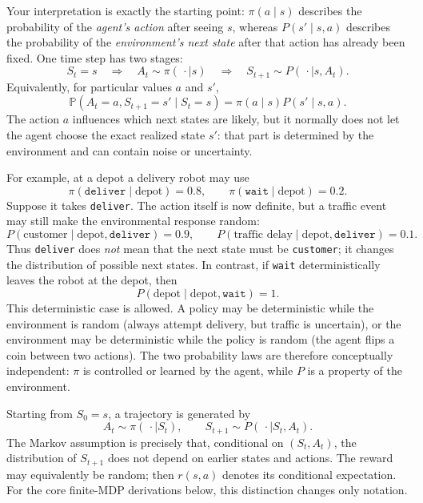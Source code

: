 \documentclass[11pt,a4paper]{article}
\theoremstyle{definition}
\begin{document}
\begin{note}
Your interpretation is exactly the starting point: $\pi(a\mid s)$ describes the probability
of the \emph{agent's action} after seeing $s$, whereas $P(s'\mid s,a)$ describes the
probability of the \emph{environment's next state} after that action has already been fixed.
One time step has two stages:
\[
S_t=s
\quad\Longrightarrow\quad
A_t\sim\pi(\,\cdot\mid s)
\quad\Longrightarrow\quad
S_{t+1}\sim P(\,\cdot\mid s,A_t).
\]
Equivalently, for particular values $a$ and $s'$,
\[
\mathbb{P}(A_t=a,S_{t+1}=s'\mid S_t=s)
=\pi(a\mid s)P(s'\mid s,a).
\]
The action $a$ influences which next states are likely, but it normally does not let the
agent choose the exact realized state $s'$: that part is determined by the environment and
can contain noise or uncertainty.

For example, at a depot a delivery robot may use
\[
\pi(\texttt{deliver}\mid\text{depot})=0.8,
\qquad
\pi(\texttt{wait}\mid\text{depot})=0.2.
\]
Suppose it takes \texttt{deliver}. The action itself is now definite, but a traffic event may
still make the environmental response random:
\[
P(\text{customer}\mid\text{depot},\texttt{deliver})=0.9,
\qquad
P(\text{traffic delay}\mid\text{depot},\texttt{deliver})=0.1.
\]
Thus \texttt{deliver} does \emph{not} mean that the next state must be
\texttt{customer}; it changes the distribution of possible next states. In contrast, if
\texttt{wait} deterministically leaves the robot at the depot, then
\[
P(\text{depot}\mid\text{depot},\texttt{wait})=1.
\]
This deterministic case is allowed. A policy may be deterministic while the environment is
random (always attempt delivery, but traffic is uncertain), or the environment may be
deterministic while the policy is random (the agent flips a coin between two actions). The
two probability laws are therefore conceptually independent: $\pi$ is controlled or learned
by the agent, while $P$ is a property of the environment.
\end{note}

\begin{note}
Starting from $S_0=s$, a trajectory is generated by
\[
A_t\sim\pi(\,\cdot\mid S_t),
\qquad
S_{t+1}\sim P(\,\cdot\mid S_t,A_t).
\]
The Markov assumption is precisely that, conditional on $(S_t,A_t)$, the distribution of
$S_{t+1}$ does not depend on earlier states and actions. The reward may equivalently be
random; then $r(s,a)$ denotes its conditional expectation. For the core finite-MDP
derivations below, this distinction changes only notation.
\end{note}
\end{document}

